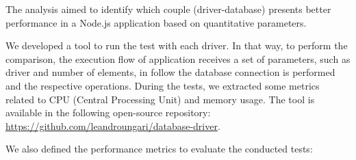 \documentclass{svproc}
\begin{document}



The analysis aimed to identify which couple (driver-database) presents better performance in a Node.js application based on quantitative parameters.

We developed a tool to run the test with each driver. In that way, to perform the comparison, the execution flow of application receives a set of parameters, such as driver and number of elements, in follow the database connection is performed and the respective operations. During the tests, we extracted some metrics related to CPU (Central Processing Unit) and memory usage. 
The tool is available in the following open-source repository: \url{https://github.com/leandroungari/database-driver}.

We also defined the performance metrics to evaluate the conducted tests:


\end{document}
